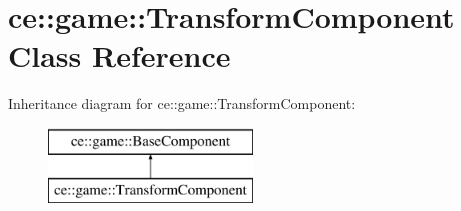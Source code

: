 \hypertarget{classce_1_1game_1_1_transform_component}{}\section{ce\+:\+:game\+:\+:Transform\+Component Class Reference}
\label{classce_1_1game_1_1_transform_component}
Inheritance diagram for ce\+:\+:game\+:\+:Transform\+Component\+:\begin{figure}[H]
\begin{center}
\leavevmode
\includegraphics[height=2.000000cm]{classce_1_1game_1_1_transform_component}
\end{center}
\end{figure}
